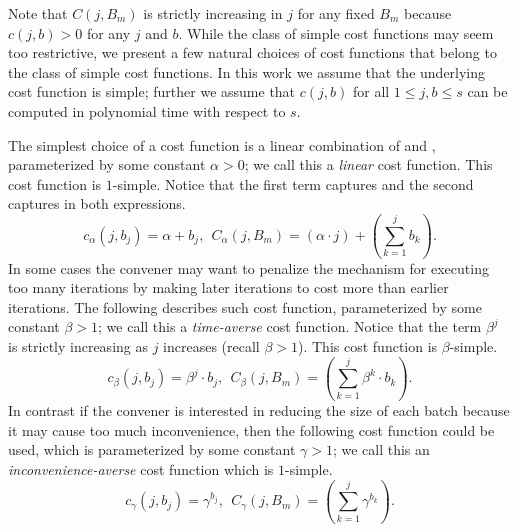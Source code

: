 Note that $C(j, B_{m})$ is strictly increasing in $j$ for any fixed $B_{m}$ because $c(j, b) > 0$ for any $j$ and $b$. While the class of simple cost functions may seem too restrictive, we present a few natural choices of cost functions that belong to the class of simple cost functions. In this work we assume that the underlying cost function is simple; further we assume that $c(j, b)$ for all $1 \leq j, b \leq s$ can be computed in polynomial time with respect to $s$.
\begin{example} \label{bdoodle:eg:costFunctions}
The simplest choice of a cost function is a linear combination of \Times and \Inconvenience, parameterized by some constant $\alpha > 0$; we call this a \emph{linear} cost function. This cost function is $1$-simple. Notice that the first term captures \Times and the second captures \Inconveniences in both expressions.  
\begin{equation} \label{bdoodle:eqn:linear_cost_function}
c_{\alpha}(j, b_j) = \alpha + b_j, ~~ C_{\alpha}(j, {B}_m) = \left(\alpha \cdot j\right) + \left(\sum_{k=1}^{j} b_k\right).
\end{equation}
In some cases the convener may want to penalize the mechanism for executing too many iterations by making later iterations to cost more than earlier iterations. The following describes such cost function, parameterized by some constant $\beta > 1$; we call this a \emph{time-averse} cost function. Notice that the term $\beta^j$ is strictly increasing as $j$ increases (recall $\beta > 1$). This cost function is $\beta$-simple.
\begin{equation} \label{bdoodle:eqn:time_averse_cost_function}
c_{\beta}(j, b_j) = \beta^j \cdot b_j, ~~ C_{\beta}(j, {B}_m) = \left(\sum_{k=1}^{j} \beta^k \cdot b_k \right).
\end{equation}
In contrast if the convener is interested in reducing the size of each batch because it may cause too much inconvenience, then the following cost function could be used, which is parameterized by some constant $\gamma > 1$; we call this an \emph{inconvenience-averse} cost function which is $1$-simple.
\begin{equation} \label{bdoodle:eqn:inconvenience_averse_cost_function}
c_{\gamma}(j, b_j) = \gamma^{b_j}, ~~ C_{\gamma}(j, {B}_m) = \left(\sum_{k=1}^{j} \gamma^{b_k} \right).
\end{equation}
\end{example}


